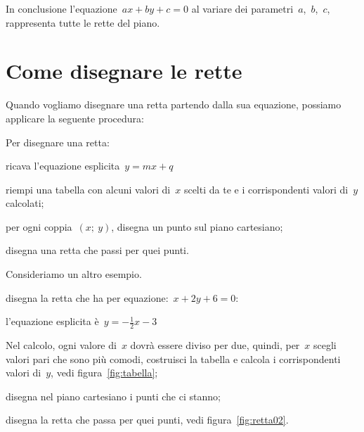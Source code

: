 \begin{inaccessibleblock}
 \begin{minipage}[]{.50\textwidth}
  \begin{center}\end{center}
 \end{minipage}
 \begin{minipage}[]{.40\textwidth}
  \begin{center}\end{center}
 \end{minipage}
\end{inaccessibleblock}

In conclusione l'equazione~\(ax + by + c = 0\) al variare dei 
parametri~\(a\),~\(b\),~\(c\), rappresenta tutte le rette del piano.

\section{Come disegnare le rette}
\label{sec:retta_disegno}

Quando vogliamo disegnare una retta partendo dalla sua equazione, possiamo
applicare la seguente procedura:

\begin{procedura}
 Per disegnare una retta:
 \begin{enumeratea}
  \item ricava l'equazione esplicita~\(y=mx+q\)
  \item riempi una tabella con alcuni valori di~\(x\) scelti da te e i 
   corrispondenti valori di~\(y\) calcolati;
  \item per ogni coppia~\((x;~y)\), disegna un punto sul piano cartesiano;
  \item disegna una retta che passi per quei punti.
 \end{enumeratea}
\end{procedura}

Consideriamo un altro esempio. 

\begin{procedura}
 disegna la retta che ha per equazione:~\(x+2y+6=0\):
 \begin{enumeratea}
  \item l'equazione esplicita è~\(y=- \frac{1}{2}x - 3\)
  \item Nel calcolo, ogni valore di~\(x\) dovrà essere diviso per due, 
   quindi, per~\(x\) scegli valori pari che sono più comodi, costruisci la 
   tabella e calcola i corrispondenti valori di~\(y\), 
   vedi figura~\ref{fig:tabella};
  \item disegna nel piano cartesiano i punti che ci stanno;
  \item disegna la retta che passa per quei punti, 
   vedi figura~\ref{fig:retta02}.
 \end{enumeratea}
\end{procedura}

